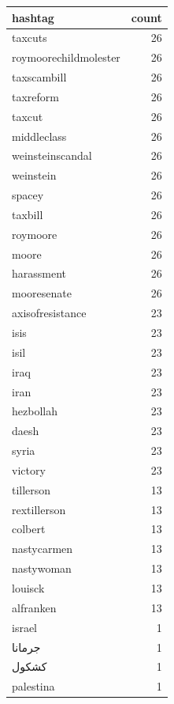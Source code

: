 \begin{tabular}{lr}
\toprule
hashtag & count \\
\midrule
taxcuts & 26 \\
roymoorechildmolester & 26 \\
taxscambill & 26 \\
taxreform & 26 \\
taxcut & 26 \\
middleclass & 26 \\
weinsteinscandal & 26 \\
weinstein & 26 \\
spacey & 26 \\
taxbill & 26 \\
roymoore & 26 \\
moore & 26 \\
harassment & 26 \\
mooresenate & 26 \\
axisofresistance & 23 \\
isis & 23 \\
isil & 23 \\
iraq & 23 \\
iran & 23 \\
hezbollah & 23 \\
daesh & 23 \\
syria & 23 \\
victory & 23 \\
tillerson & 13 \\
rextillerson & 13 \\
colbert & 13 \\
nastycarmen & 13 \\
nastywoman & 13 \\
louisck & 13 \\
alfranken & 13 \\
israel & 1 \\
جرمانا & 1 \\
كشكول & 1 \\
palestina & 1 \\
\bottomrule
\end{tabular}
